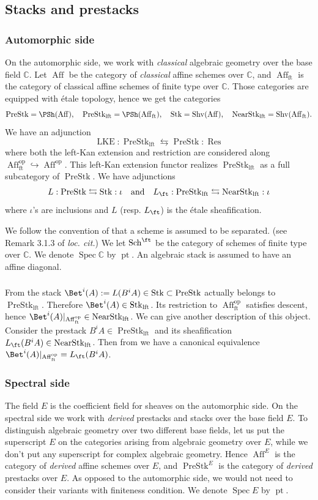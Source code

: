 \documentclass[10pt]{amsart}
\newcommand{\sssec}{\subsubsection}
\theoremstyle{remark}
\newcommand{\te}{\text}
\newcommand{\C}{\mathbb{C}}
\newcommand{\on}{\operatorname}
\newcommand{\Shv}{\on{Shv}}
\newcommand{\PreStk}{\on{PreStk}}
\newcommand{\PreStklft}{\on{PreStk}_{\on{lft}}}
\newcommand{\Stk}{\on{Stk}}
\newcommand{\Stklft}{\on{Stk}_{\on{lft}}}
\newcommand{\NearStklft}{\on{NearStk}_{\on{lft}}}
\newcommand{\Aff}{\on{Aff}}
\newcommand{\Affft}{\on{Aff}_{\on{ft}}}
\DeclareMathOperator{\op}{op}
\newcommand{\pt}{\on{pt}}
\DeclareMathOperator{\Spec}{Spec}
\begin{document}
\subsection{Stacks and prestacks}
\sssec{Automorphic side}\label{sssec: AG convention}
On the automorphic side, we work with \emph{classical} algebraic geometry over the base field $\C$. Let $\Aff$ be the category of \emph{classical} affine schemes over $\C$, and $\Affft$ is the category of classical affine schemes of finite type over $\C$. Those categories are equipped with \'etale topology, hence we get the categories
\[\PreStk=\PSh(\Aff),\quad \PreStklft=\PSh(\Affft),\quad \Stk=\Shv(\Aff),\quad \NearStklft=\Shv(\Affft).\]
We have an adjunction
\[\on{LKE}:\PreStklft\leftrightarrows \PreStk:\on{Res}\]
where both the left-Kan extension and restriction are considered along $\Affft^{\op}\hookrightarrow \Aff^{\op}$. This left-Kan extension functor realizes $\PreStklft$ as a full subcategory of $\PreStk$.
We have adjunctions 
\[L:\PreStk\leftrightarrows \Stk:\iota\quad \te{and}\quad L_{\ft}:\PreStklft\leftrightarrows \NearStklft: \iota\]
where $\iota$'s are inclusions and $L$ (resp. $L_{\ft}$) is the \'etale sheafification.
\medskip

We follow the convention of \cite{GR} that a scheme is assumed to be separated. (see Remark 3.1.3 of \emph{loc. cit.}) We let $\on{Sch}^{\ft}$ be the category of schemes of finite type over $\C$. We denote $\Spec \C$ by $\pt$. An algebraic stack is assumed to have an affine diagonal.

\sssec{}
From \cite[Sect. 1.3.4]{GL} the stack $\Bet^i(A):=L(B^i A)\in\Stk\subset\PreStk$ actually belongs to $\PreStklft$. Therefore $\Bet^i (A)\in\Stklft$. Its restriction to $\Affft^{\op}$ satisfies descent, hence $\Bet^i (A)|_{\Affft^{\op}}\in\NearStklft$. We can give another description of this object. Consider the prestack $B^i A\in\PreStklft$ and its sheafification $L_{\ft}(B^i A)\in\NearStklft$. Then from \cite[Corollary 2.7.5]{GR} we have a canonical equivalence $\Bet^i (A)|_{\Affft^{\op}} = L_{\ft}(B^i A)$.

\sssec{Spectral side}
The field $E$ is the coefficient field for sheaves on the automorphic side. On the spectral side we work with \emph{derived} prestacks and stacks over the base field $E$. To distinguish algebraic geometry over two different base fields, let us put the superscript $E$ on the categories arising from algebraic geometry over $E$, while we don't put any superscript for complex algebraic geometry. Hence $\Aff^E$ is the category of \emph{derived} affine schemes over $E$, and $\PreStk^E$ is the category of \emph{derived} prestacks over $E$. As opposed to the automorphic side, we would not need to consider their variants with finiteness condition. We denote $\Spec E$ by $\pt$.
\end{document}
